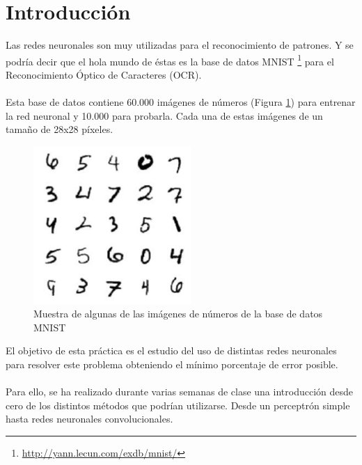 \newpage %

\tableofcontents %


\newpage


\section{Introducción}

Las redes neuronales son muy utilizadas para el reconocimiento de patrones. Y se podría decir que el hola mundo de éstas es la base de datos MNIST \footnote{\url{http://yann.lecun.com/exdb/mnist/}} para el Reconocimiento Óptico de Caracteres (OCR).
\\ \\
Esta base de datos contiene 60.000 imágenes de números (Figura \ref{fig:sample-mnist-data}) para entrenar la red neuronal y 10.000 para probarla. Cada una de estas imágenes de un tamaño de 28x28 píxeles.
\begin{figure}[H]
	\centering
	\includegraphics[width=6cm]{img/sample-mnist-data}
	\caption{Muestra de algunas de las imágenes de números de la base de datos MNIST}
	\label{fig:sample-mnist-data}
\end{figure}
El objetivo de esta práctica es el estudio del uso de distintas redes neuronales para resolver este problema obteniendo el mínimo porcentaje de error posible.
\\ \\
Para ello, se ha realizado durante varias semanas de clase una introducción desde cero de los distintos métodos que podrían utilizarse. Desde un perceptrón simple hasta redes neuronales convolucionales.

